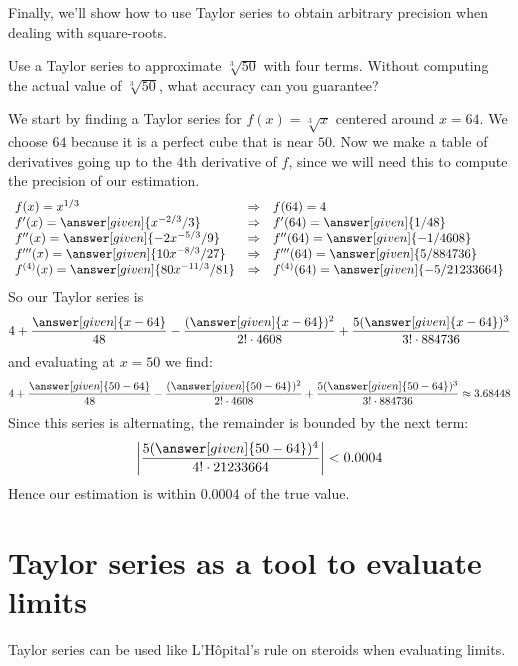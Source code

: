 \documentclass{ximera}
\begin{document}
Finally, we'll show how to use Taylor series to obtain arbitrary
precision when dealing with square-roots.

\begin{example}
  Use a Taylor series to approximate $\sqrt[3]{50}$ with four
  terms. Without computing the actual value of $\sqrt[3]{50}$, what
  accuracy can you guarantee?
  \begin{explanation}
    We start by finding a Taylor series for $f(x) = \sqrt[3]{x}$
    centered around $x=64$. We choose $64$ because it is a perfect
    cube that is near $50$. Now we make a table of derivatives going
    up to the $4$th derivative of $f$, since we will need this to
    compute the precision of our estimation.
    \[
    \begin{array}{lcl}
      f(x) = x^{1/3} & \Rightarrow &f(64) = 4\\
      f'(x) = \answer[given]{x^{-2/3}/3} & \Rightarrow & f'(64) = \answer[given]{1/48}\\
      f''(x) = \answer[given]{-2x^{-5/3}/9} &\Rightarrow &f''(64) = \answer[given]{-1/4608}\\
      f'''(x) = \answer[given]{10x^{-8/3}/27} &\Rightarrow &f'''(64) = \answer[given]{5/884736}\\
      f^{(4)}(x) = \answer[given]{80 x^{-11/3}/81} &\Rightarrow &f^{(4)}(64) = \answer[given]{-5/21233664}
    \end{array}
    \]
    So our Taylor series is
    \[
    4 + \frac{\answer[given]{x-64}}{48} - \frac{(\answer[given]{x-64})^2}{2!\cdot 4608} + \frac{5(\answer[given]{x-64})^3}{3!\cdot 884736}
    \]
    and evaluating at $x=50$ we find:
    \[
    4 + \frac{\answer[given]{50-64}}{48} - \frac{(\answer[given]{50-64})^2}{2!\cdot 4608} + \frac{5(\answer[given]{50-64})^3}{3!\cdot 884736} \approx 3.68448
    \]
    Since this series is alternating, the remainder is bounded by the next term:
    \[
    \left|\frac{5(\answer[given]{50-64})^4}{4!\cdot 21233664}\right| < 0.0004 
    \]
    Hence our estimation is within $0.0004$ of the true value.
  \end{explanation}
\end{example}




\section{Taylor series as a tool to evaluate limits}

Taylor series can be used like L'H\^{o}pital's rule on steroids when
evaluating limits.
\end{document}
